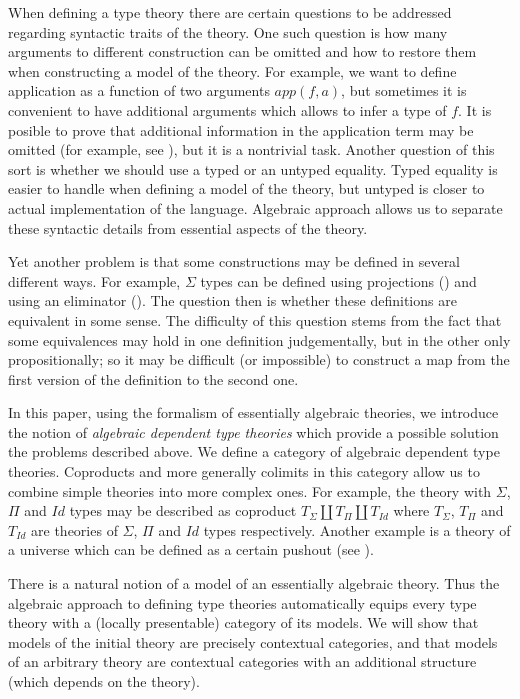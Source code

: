 \documentclass[reqno]{amsart}
\theoremstyle{definition}
\theoremstyle{remark}
\numberwithin{figure}{section}
\begin{document}
When defining a type theory there are certain questions to be addressed regarding syntactic traits of the theory.
One such question is how many arguments to different construction can be omitted and how to restore them when constructing a model of the theory.
For example, we want to define application as a function of two arguments $app(f,a)$, but sometimes it is convenient to have additional arguments which allows to infer a type of $f$.
It is posible to prove that additional information in the application term may be omitted (for example, see \cite{streicher}), but it is a nontrivial task.
Another question of this sort is whether we should use a typed or an untyped equality.
Typed equality is easier to handle when defining a model of the theory, but untyped is closer to actual implementation of the language.
Algebraic approach allows us to separate these syntactic details from essential aspects of the theory.

Yet another problem is that some constructions may be defined in several different ways.
For example, $\Sigma$ types can be defined using projections () and using an eliminator ().
The question then is whether these definitions are equivalent in some sense.
The difficulty of this question stems from the fact that some equivalences may hold in one definition judgementally, but in the other only propositionally;
so it may be difficult (or impossible) to construct a map from the first version of the definition to the second one.

In this paper, using the formalism of essentially algebraic theories, we introduce the notion of
\emph{algebraic dependent type theories} which provide a possible solution the problems described above.
We define a category of algebraic dependent type theories.
Coproducts and more generally colimits in this category allow us to combine simple theories into more complex ones.
For example, the theory with $\Sigma$, $\Pi$ and $Id$ types may be described as coproduct $T_\Sigma \amalg T_\Pi \amalg T_{Id}$
where $T_\Sigma$, $T_\Pi$ and $T_{Id}$ are theories of $\Sigma$, $\Pi$ and $Id$ types respectively.
Another example is a theory of a universe which can be defined as a certain pushout (see ).

There is a natural notion of a model of an essentially algebraic theory.
Thus the algebraic approach to defining type theories automatically equips every type theory with a (locally presentable) category of its models.
We will show that models of the initial theory are precisely contextual categories,
and that models of an arbitrary theory are contextual categories with an additional structure (which depends on the theory).
\end{document}
